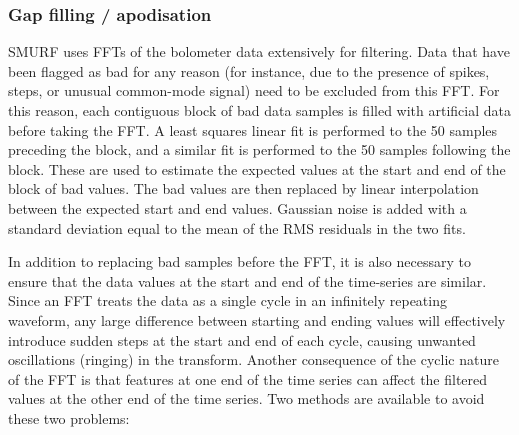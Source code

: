 \documentclass[useAMS,usenatbib,nofootinbib]{mn2e}
\begin{document}
\subsubsection{Gap filling / apodisation}
\label{sec:gaps}

SMURF uses FFTs of the bolometer data extensively for filtering.  Data
that have been flagged as bad for any reason (for instance, due to the
presence of spikes, steps, or unusual common-mode signal) need to be
excluded from this FFT. For this reason, each contiguous block of bad
data samples is filled with artificial data before taking the FFT. A
least squares linear fit is performed to the 50 samples preceding the
block, and a similar fit is performed to the 50 samples following the
block. These are used to estimate the expected values at the start and
end of the block of bad values. The bad values are then replaced by
linear interpolation between the expected start and end
values. Gaussian noise is added with a standard deviation equal to the
mean of the RMS residuals in the two fits.

In addition to replacing bad samples before the FFT, it is also
necessary to ensure that the data values at the start and end of the
time-series are similar. Since an FFT treats the data as a single
cycle in an infinitely repeating waveform, any large difference
between starting and ending values will effectively introduce sudden
steps at the start and end of each cycle, causing unwanted
oscillations (ringing) in the transform. Another consequence of the
cyclic nature of the FFT is that features at one end of the time
series can affect the filtered values at the other end of the time
series. Two methods are available to avoid these two problems:
\end{document}
